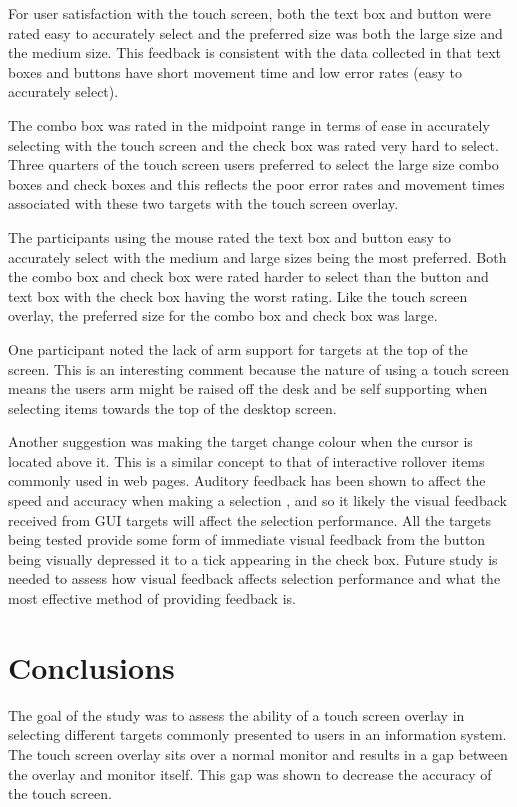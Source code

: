 \documentclass{elsart}
\begin{document}
For user satisfaction with the touch screen, both the text box and
button were rated easy to accurately select and the preferred size was
both the large size and the medium size. This feedback is consistent
with the data collected in that text boxes and buttons have short
movement time and low error rates (easy to accurately select).

The combo box was rated in the midpoint range in terms of ease in
accurately selecting with the touch screen and the check box was rated
very hard to select. Three quarters of the touch screen users preferred
to select the large size combo boxes and check boxes and this reflects
the poor error rates and movement times associated with these two
targets with the touch screen overlay.

The participants using the mouse rated the text box and button easy to
accurately select with the medium and large sizes being the most
preferred. Both the combo box and check box were rated harder to select
than the button and text box with the check box having the worst rating.
Like the touch screen overlay, the preferred size for the combo box and
check box was large.

One participant noted the lack of arm support for targets at the top of
the screen. This is an interesting comment because the nature of using a
touch screen means the users arm might be raised off the desk and be
self supporting when selecting items towards the top of the desktop
screen.

Another suggestion was making the target change colour when the cursor
is located above it. This is a similar concept to that of interactive
rollover items commonly used in web pages. Auditory feedback has been
shown to affect the speed and accuracy when making a selection
\citep{Bend-G-1999-PhD}, and so it likely the visual feedback received
from GUI targets will affect the selection performance. All the targets
being tested provide some form of immediate visual feedback from the
button being visually depressed it to a tick appearing in the check box.
Future study is needed to assess how visual feedback affects selection
performance and what the most effective method of providing feedback is.

\section{Conclusions}
\label{sec-conclusions}

The goal of the study was to assess the ability of a touch screen
overlay in selecting different targets commonly presented to users in an
information system. The touch screen overlay sits over a normal monitor
and results in a gap between the overlay and monitor itself. This gap
was shown to decrease the accuracy of the touch screen.
\end{document}
